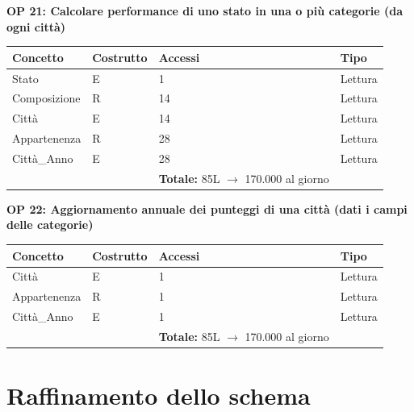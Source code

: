 \documentclass[a4paper,12pt]{report}
\begin{document}
            \textbf{OP 21: Calcolare performance di uno stato in una o più categorie (da ogni città)}
        	\begin{table}[H]
            \centering
             \begin{tabular}{llll}
             \rowcolor{yellow!20} \textbf{Concetto} & \textbf{Costrutto} & \textbf{Accessi} & \textbf{Tipo}\\ [0.5ex] 
             \hline
             Stato & E & 1 & Lettura \\ 
             Composizione & R & 14 & Lettura \\ 
             Città & E & 14 & Lettura \\ 
             Appartenenza & R & 28 & Lettura \\ 
             Città\_Anno & E & 28 & Lettura \\ 
             \hline
                \rowcolor{yellow!20} &   & \textbf{Totale:} 85L $\rightarrow$ 170.000 al giorno &  \\ [1ex] 
             
             \end{tabular}
            \end{table}

            \textbf{OP 22: Aggiornamento annuale dei punteggi di una città (dati i campi delle categorie)}
        	\begin{table}[H]
            \centering
             \begin{tabular}{llll}
             \rowcolor{yellow!20} \textbf{Concetto} & \textbf{Costrutto} & \textbf{Accessi} & \textbf{Tipo}\\ [0.5ex] 
             \hline
             Città & E & 1 & Lettura \\ 
             Appartenenza & R & 1 & Lettura \\ 
             Città\_Anno & E & 1 & Lettura \\ 
             \hline
                \rowcolor{yellow!20} &   & \textbf{Totale:} 85L $\rightarrow$ 170.000 al giorno &  \\ [1ex] 
             
             \end{tabular}
            \end{table}
        
        \section{Raffinamento dello schema}
\end{document}
